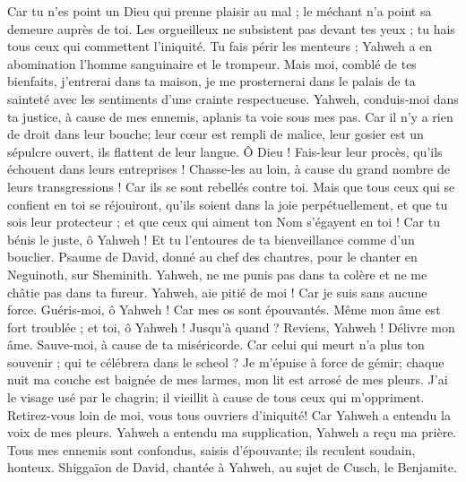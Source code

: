 \begin{multicols}{2}
Car tu n'es point un Dieu qui prenne plaisir au mal ; le méchant n'a point sa demeure auprès de toi.
Les orgueilleux ne subsistent pas devant tes yeux ; tu hais tous ceux qui commettent l'iniquité.
Tu fais périr les menteurs ; Yahweh a en abomination l'homme sanguinaire et le trompeur.
Mais moi, comblé de tes bienfaits, j'entrerai dans ta maison, je me prosternerai dans le palais de ta sainteté avec les sentiments d'une crainte respectueuse.
Yahweh, conduis-moi dans ta justice, à cause de mes ennemis, aplanis ta voie sous mes pas.
Car il n'y a rien de droit dans leur bouche; leur cœur est rempli de malice, leur gosier est un sépulcre ouvert, ils flattent de leur langue.
Ô Dieu ! Fais-leur leur procès, qu'ils échouent dans leurs entreprises ! Chasse-les au loin, à cause du grand nombre de leurs transgressions ! Car ils se sont rebellés contre toi.
Mais que tous ceux qui se confient en toi se réjouiront, qu'ils soient dans la joie perpétuellement, et que tu sois leur protecteur ; et que ceux qui aiment ton Nom s'égayent en toi !
Car tu bénis le juste, ô Yahweh ! Et tu l'entoures de ta bienveillance comme d'un bouclier.
\VerseOne{}Psaume de David, donné au chef des chantres, pour le chanter en Neguinoth, sur Sheminith.
Yahweh, ne me punis pas dans ta colère et ne me châtie pas dans ta fureur.
Yahweh, aie pitié de moi ! Car je suis sans aucune force. Guéris-moi, ô Yahweh ! Car mes os sont épouvantés.
Même mon âme est fort troublée ; et toi, ô Yahweh ! Jusqu'à quand ?
Reviens, Yahweh ! Délivre mon âme. Sauve-moi, à cause de ta miséricorde.
Car celui qui meurt n'a plus ton souvenir ; qui te célébrera dans le scheol ?
Je m'épuise à force de gémir; chaque nuit ma couche est baignée de mes larmes, mon lit est arrosé de mes pleurs.
J'ai le visage usé par le chagrin; il vieillit à cause de tous ceux qui m'oppriment.
Retirez-vous loin de moi, vous tous ouvriers d'iniquité! Car Yahweh a entendu la voix de mes pleurs.
Yahweh a entendu ma supplication, Yahweh a reçu ma prière.
Tous mes ennemis sont confondus, saisis d'épouvante; ils reculent soudain, honteux.
\VerseOne{}Shiggaïon de David, chantée à Yahweh, au sujet de Cusch, le Benjamite.

\end{multicols}
